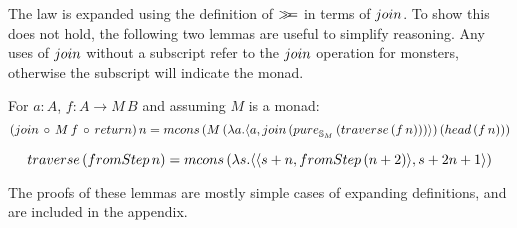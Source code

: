 The law is expanded using the definition of $\mathbin{\gg\!\!=}$ in terms of $\join$. 
To show this does not hold, the following two lemmas are useful to simplify reasoning. Any uses of $\join$ without a subscript refer to the $\join$ operation for monsters, otherwise the subscript will indicate the monad.

\begin{lemma}\label{lemma:general_bind_law}
For $a : A$, $f : A \rightarrow M\, B$ and assuming $M$ is a monad:
$$
(\join\, \comp\,  M\, f\, \comp\, \return)\, n = \mcons\, (M\,(\lambda a . \pair{a}{\join\, (\apure_{\stream{M}}\, (\mathsf{traverse}\, (f\, n)))})\, (\head\, (f\, n)))
$$
\end{lemma}
\begin{lemma}\label{lemma:traverse_fromstepstr}
$$
\mathsf{traverse}\, (\fromstepstr\, n) = \mcons\, (\lambda s . \pair{\pair{s+n}{\fromstepstr\, (n + 2)}}{s + 2n + 1})
$$
\end{lemma} 

The proofs of these lemmas are mostly simple cases of expanding definitions, and are included in the appendix.

